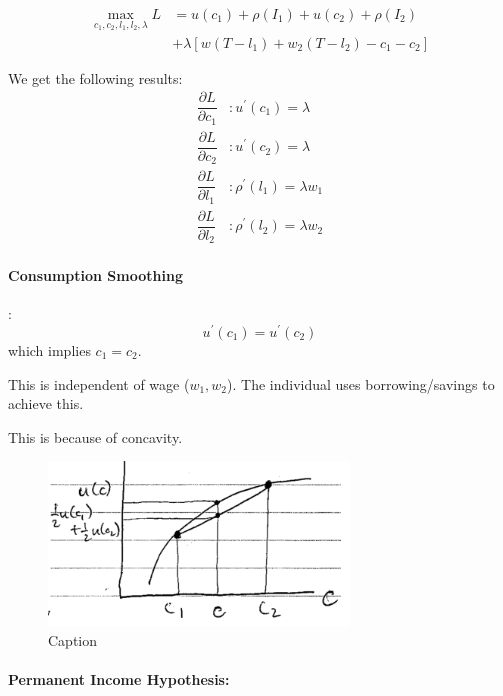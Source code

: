 \documentclass[11pt]{article}
\begin{document}
\begin{equation}
\begin{aligned}
\max _{c_1, c_2, l_1, l_2, \lambda} L & =u\left(c_1\right)+\rho\left(I_1\right)+u\left(c_2\right)+\rho\left(I_2\right) \\
& +\lambda\left[w\left(T-l_1\right)+w_2\left(T-l_2\right)-c_1-c_2\right]
\end{aligned}
\end{equation}

We get the following results:
\begin{align*}
    \dfrac{\partial L}{\partial c_1}&: u^\prime (c_1) = \lambda \\
    \dfrac{\partial L}{\partial c_2}&: u^\prime (c_2) = \lambda \\
    \dfrac{\partial L}{\partial l_1}&: \rho^\prime (l_1) = \lambda w_1 \\
    \dfrac{\partial L}{\partial l_2}&: \rho^\prime (l_2) = \lambda w_2
\end{align*}

    \paragraph{Consumption Smoothing}: \mbox{}
    \[u^\prime (c_1) = u^\prime (c_2)\]
    which implies $c_1 = c_2$.
    \begin{note}
        This is independent of wage ($w_1,w_2$). The individual uses borrowing/savings to achieve this.
    \end{note}
    This is because of concavity.

\begin{figure}[h]
        \centering
        \includegraphics[width=8cm]{photos/consumption smoothing.png}
        \caption{Caption}
        \label{fig:my_label}
\end{figure}

    \paragraph{Permanent Income Hypothesis:} \mbox{}
\end{document}

